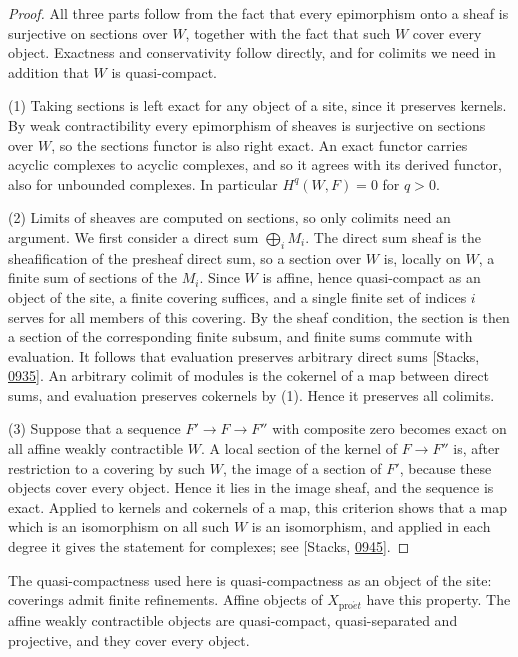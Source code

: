 \documentclass[11pt]{article}
\begin{document}
\begin{proof}[{Proof}]\label{bp58}%
All three parts follow from the fact that every epimorphism onto a sheaf is surjective on sections over \(W\), together with the fact that such \(W\) cover every object. Exactness and conservativity follow directly, and for colimits we need in addition that \(W\) is quasi-compact.

(1) Taking sections is left exact for any object of a site, since it preserves kernels. By weak contractibility every epimorphism of sheaves is surjective on sections over \(W\), so the sections functor is also right exact. An exact functor carries acyclic complexes to acyclic complexes, and so it agrees with its derived functor, also for unbounded complexes. In particular \(H^q(W,F)=0\) for \(q>0\).

(2) Limits of sheaves are computed on sections, so only colimits need an argument. We first consider a direct sum \(\bigoplus_iM_i\). The direct sum sheaf is the sheafification of the presheaf direct sum, so a section over \(W\) is, locally on \(W\), a finite sum of sections of the \(M_i\). Since \(W\) is affine, hence quasi-compact as an object of the site, a finite covering suffices, and a single finite set of indices \(i\) serves for all members of this covering. By the sheaf condition, the section is then a section of the corresponding finite subsum, and finite sums commute with evaluation. It follows that evaluation preserves arbitrary direct sums [Stacks, \href{https://stacks.math.columbia.edu/tag/0935}{0935}]. An arbitrary colimit of modules is the cokernel of a map between direct sums, and evaluation preserves cokernels by (1). Hence it preserves all colimits.

(3) Suppose that a sequence \(F'\to F\to F''\) with composite zero becomes exact on all affine weakly contractible \(W\). A local section of the kernel of \(F\to F''\) is, after restriction to a covering by such \(W\), the image of a section of \(F'\), because these objects cover every object. Hence it lies in the image sheaf, and the sequence is exact. Applied to kernels and cokernels of a map, this criterion shows that a map which is an isomorphism on all such \(W\) is an isomorphism, and applied in each degree it gives the statement for complexes; see [Stacks, \href{https://stacks.math.columbia.edu/tag/0945}{0945}].
\end{proof}

\label{bp59}%
The quasi-compactness used here is quasi-compactness as an object of the site: coverings admit finite refinements. Affine objects of \(X_{\mathrm{pro}\acute{e}t}\) have this property. The affine weakly contractible objects are quasi-compact, quasi-separated and projective, and they cover every object.
\end{document}
